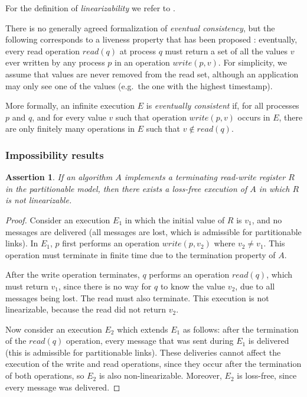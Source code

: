 \documentclass[fleqn,12pt,lineno]{wlpeerj} %
\newtheorem{theorem}{Assertion}
\begin{document}
For the definition of \emph{linearizability} we refer to \citet{Herlihy1990jq}.

There is no generally agreed formalization of \emph{eventual consistency}, but the following
corresponds to a liveness property that has been proposed \citep{Bailis2013jc,Attiya2015dm}:
eventually, every read operation $\mathit{read}(q)$ at process $q$ must return a set of all the
values $v$ ever written by any process $p$ in an operation $\mathit{write}(p, v)$. For simplicity,
we assume that values are never removed from the read set, although an application may only see one
of the values (e.g.\ the one with the highest timestamp).

More formally, an infinite execution $E$ is \emph{eventually consistent} if, for all processes $p$
and $q$, and for every value $v$ such that operation $\mathit{write}(p, v)$ occurs in $E$, there are
only finitely many operations in $E$ such that $v \notin \mathit{read}(q)$.

\subsubsection{Impossibility results}\label{sec:impossibility}

\begin{theorem}\label{th:1}
If an algorithm $A$ implements a terminating read-write register $R$ in the partitionable model,
then there exists a loss-free execution of $A$ in which $R$ is not linearizable.
\end{theorem}

\begin{proof}
Consider an execution $E_1$ in which the initial value of $R$ is $v_1$, and no messages are
delivered (all messages are lost, which is admissible for partitionable links). In $E_1$, $p$ first
performs an operation $\mathit{write}(p, v_2)$ where $v_2 \neq v_1$. This operation must terminate
in finite time due to the termination property of $A$.

After the write operation terminates, $q$ performs an operation $\mathit{read}(q)$, which must
return $v_1$, since there is no way for $q$ to know the value $v_2$, due to all messages being lost.
The read must also terminate. This execution is not linearizable, because the read did not return
$v_2$.

Now consider an execution $E_2$ which extends $E_1$ as follows: after the termination of the
$\mathit{read}(q)$ operation, every message that was sent during $E_1$ is delivered (this is
admissible for partitionable links). These deliveries cannot affect the execution of the write and
read operations, since they occur after the termination of both operations, so $E_2$ is also
non-linearizable. Moreover, $E_2$ is loss-free, since every message was delivered.
\end{proof}
\end{document}
